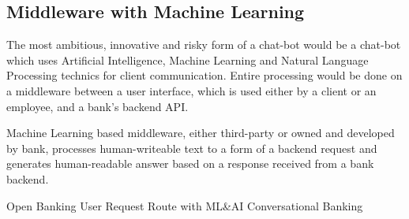\subsection{Middleware with Machine Learning}

The most ambitious, innovative and risky form of a chat-bot would be a chat-bot which uses Artificial Intelligence, Machine Learning and Natural Language Processing technics for client communication.
Entire processing would be done on a middleware between a user interface, which is used either by a client or an employee, and a bank's backend API.

Machine Learning based middleware, either third-party or owned and developed by bank, processes human-writeable text to a form of a backend request and generates human-readable answer based on a response received from a bank backend.

\begin{table}
    \centering
    \caption{Open Banking User Request Route with ML\&AI Conversational Banking}
    \medskip
\end{table}

